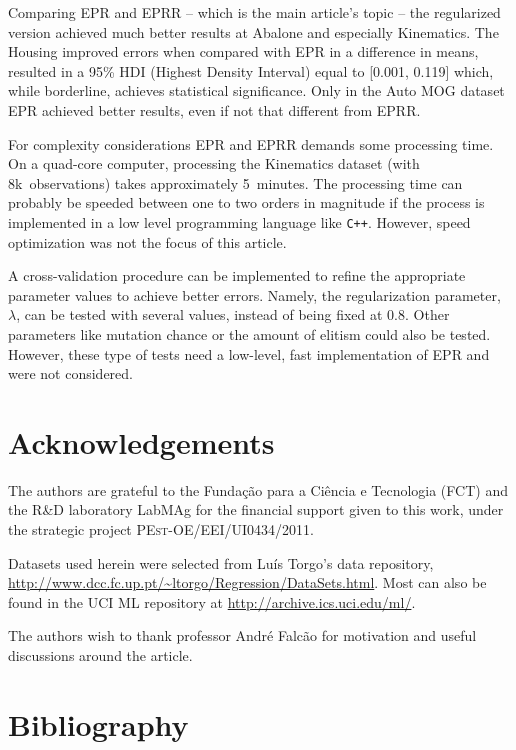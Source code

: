 \documentclass[preprint,authoryear,12pt]{elsarticle}
\begin{document}
Comparing \ac{EPR} and \ac{EPRR} -- which is the main article's topic -- the regularized version achieved much better results at Abalone and especially Kinematics. The Housing improved errors when compared with \ac{EPR} in a difference in means, resulted in a 95\% HDI (Highest Density Interval) equal to [0.001, 0.119] which, while borderline, achieves statistical significance. Only in the Auto MOG dataset \ac{EPR} achieved better results, even if not that different from \ac{EPRR}.

For complexity considerations \ac{EPR} and \ac{EPRR} demands some processing time. On a quad-core computer, processing the Kinematics dataset (with 8k~observations) takes approximately 5~minutes. The processing time can probably be speeded between one to two orders in magnitude if the process is implemented in a low level programming language like \texttt{C++}. However, speed optimization was not the focus of this article.

A cross-validation procedure can be implemented to refine the appropriate parameter values to achieve better errors. Namely, the regularization parameter, $\lambda$, can be tested with several values, instead of being fixed at $0.8$. Other parameters like mutation chance or the amount of elitism could also be tested. However, these type of tests need a low-level, fast implementation of \ac{EPR} and were not considered.

\section*{Acknowledgements}

The authors are grateful to the Fundação para a Ciência e Tecnologia (FCT) and the  R\&D laboratory LabMAg for the financial support given to this work, under the strategic project \textsc{PEst-OE/EEI/UI0434/2011}.

Datasets used herein were selected from Luís Torgo's data repository, \url{http://www.dcc.fc.up.pt/~ltorgo/Regression/DataSets.html}. Most can also be found in the UCI ML repository at \url{http://archive.ics.uci.edu/ml/}.

The authors wish to thank professor André Falcão for motivation and useful discussions around the article.

\section*{Bibliography}



    
\end{document}
